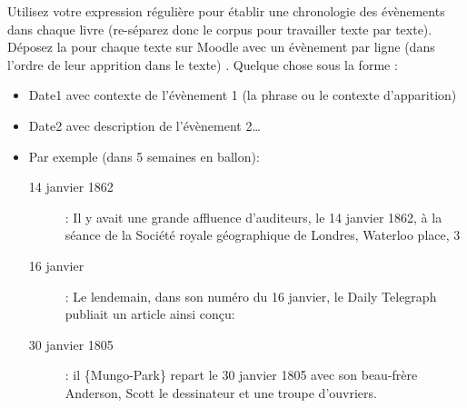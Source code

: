 Utilisez votre expression régulière pour établir une chronologie des évènements dans chaque livre (re-séparez donc le corpus pour travailler texte par texte). Déposez la pour chaque texte sur Moodle avec un évènement par ligne (dans l'ordre de leur apprition dans le texte) . Quelque chose sous la forme :
\begin{itemize}
	\item Date1 avec contexte  de l'évènement 1 (la phrase ou le contexte d'apparition) %
  \item Date2 avec description de l'évènement 2\dots
  \item Par exemple (dans 5 semaines en ballon):
  \begin{description}
    \item[14 janvier 1862] : Il y avait une grande affluence d'auditeurs, le 14 janvier 1862, à la séance de la Société royale géographique de Londres, Waterloo place, 3
    \item[16 janvier] : Le lendemain, dans son numéro du 16 janvier, le Daily Telegraph publiait un article ainsi conçu:
    \item[30 janvier 1805] : il \{Mungo-Park\} repart le 30 janvier 1805 avec son beau-frère Anderson, Scott le dessinateur et une troupe d'ouvriers.
  \end{description}
\end{itemize}

\vspace{3em}

%


